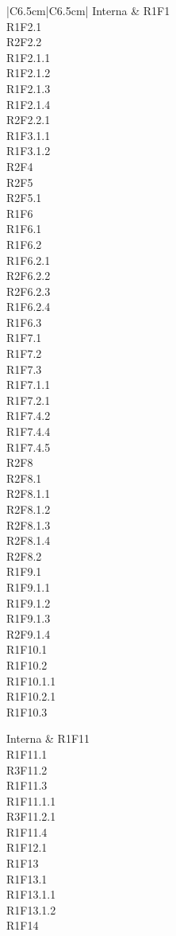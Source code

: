 \begin{longtable}{|C{6.5cm}|C{6.5cm}|}
	Interna &
	\centering
	R1F1\\
	R1F2.1 \\
	R2F2.2\\
	R1F2.1.1\\
	R1F2.1.2\\
	R1F2.1.3\\
	R1F2.1.4\\
	R2F2.2.1\\
	R1F3.1.1\\
	R1F3.1.2\\
	R2F4\\
	R2F5\\
	R2F5.1\\
	R1F6\\
	R1F6.1\\
	R1F6.2\\
	R1F6.2.1\\
	R2F6.2.2\\
	R2F6.2.3\\
	R1F6.2.4\\
	R1F6.3\\
	R1F7.1\\
	R1F7.2\\
	R1F7.3\\
	R1F7.1.1\\
	R1F7.2.1\\
	R1F7.4.2\\
	R1F7.4.4\\
	R1F7.4.5\\
	R2F8\\
	R2F8.1\\
	R2F8.1.1\\
	R2F8.1.2\\
	R2F8.1.3\\
	R2F8.1.4\\
	R2F8.2\\
	R1F9.1\\
	R1F9.1.1\\
	R1F9.1.2\\
	R1F9.1.3\\
	R2F9.1.4\\
	R1F10.1\\
	R1F10.2\\
	R1F10.1.1\\
	R1F10.2.1\\
	R1F10.3\\

	\tabularnewline

	Interna &
	\centering
	R1F11\\
	R1F11.1\\
	R3F11.2\\
	R1F11.3\\
	R1F11.1.1\\
	R3F11.2.1\\
	R1F11.4\\
	R1F12.1\\
	R1F13\\
	R1F13.1\\
	R1F13.1.1\\
	R1F13.1.2\\
	R1F14\\


\end{longtable}
